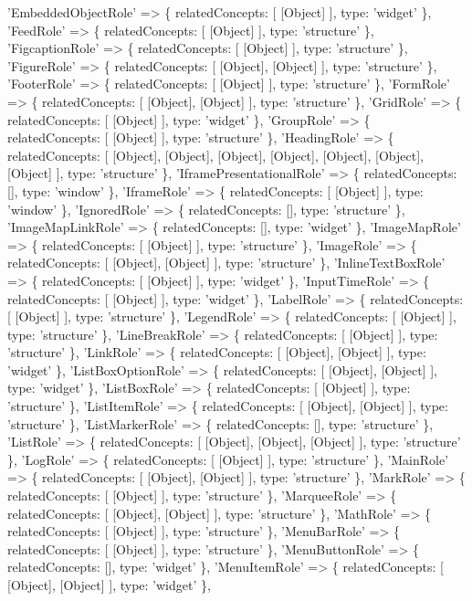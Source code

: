 \begin{DoxyCode}
  'EmbeddedObjectRole' => \{ relatedConcepts: [ [Object] ], type: 'widget' \},
  'FeedRole' => \{ relatedConcepts: [ [Object] ], type: 'structure' \},
  'FigcaptionRole' => \{ relatedConcepts: [ [Object] ], type: 'structure' \},
  'FigureRole' => \{ relatedConcepts: [ [Object], [Object] ], type: 'structure' \},
  'FooterRole' => \{ relatedConcepts: [ [Object] ], type: 'structure' \},
  'FormRole' => \{ relatedConcepts: [ [Object], [Object] ], type: 'structure' \},
  'GridRole' => \{ relatedConcepts: [ [Object] ], type: 'widget' \},
  'GroupRole' => \{ relatedConcepts: [ [Object] ], type: 'structure' \},
  'HeadingRole' => \{ relatedConcepts: [ [Object], [Object], [Object], [Object], [Object], [Object],
       [Object] ], type: 'structure' \},
  'IframePresentationalRole' => \{ relatedConcepts: [], type: 'window' \},
  'IframeRole' => \{ relatedConcepts: [ [Object] ], type: 'window' \},
  'IgnoredRole' => \{ relatedConcepts: [], type: 'structure' \},
  'ImageMapLinkRole' => \{ relatedConcepts: [], type: 'widget' \},
  'ImageMapRole' => \{ relatedConcepts: [ [Object] ], type: 'structure' \},
  'ImageRole' => \{ relatedConcepts: [ [Object], [Object] ], type: 'structure' \},
  'InlineTextBoxRole' => \{ relatedConcepts: [ [Object] ], type: 'widget' \},
  'InputTimeRole' => \{ relatedConcepts: [ [Object] ], type: 'widget' \},
  'LabelRole' => \{ relatedConcepts: [ [Object] ], type: 'structure' \},
  'LegendRole' => \{ relatedConcepts: [ [Object] ], type: 'structure' \},
  'LineBreakRole' => \{ relatedConcepts: [ [Object] ], type: 'structure' \},
  'LinkRole' => \{ relatedConcepts: [ [Object], [Object] ], type: 'widget' \},
  'ListBoxOptionRole' => \{ relatedConcepts: [ [Object], [Object] ], type: 'widget' \},
  'ListBoxRole' => \{ relatedConcepts: [ [Object] ], type: 'structure' \},
  'ListItemRole' => \{ relatedConcepts: [ [Object], [Object] ], type: 'structure' \},
  'ListMarkerRole' => \{ relatedConcepts: [], type: 'structure' \},
  'ListRole' => \{ relatedConcepts: [ [Object], [Object], [Object] ], type: 'structure' \},
  'LogRole' => \{ relatedConcepts: [ [Object] ], type: 'structure' \},
  'MainRole' => \{ relatedConcepts: [ [Object], [Object] ], type: 'structure' \},
  'MarkRole' => \{ relatedConcepts: [ [Object] ], type: 'structure' \},
  'MarqueeRole' => \{ relatedConcepts: [ [Object], [Object] ], type: 'structure' \},
  'MathRole' => \{ relatedConcepts: [ [Object] ], type: 'structure' \},
  'MenuBarRole' => \{ relatedConcepts: [ [Object] ], type: 'structure' \},
  'MenuButtonRole' => \{ relatedConcepts: [], type: 'widget' \},
  'MenuItemRole' => \{ relatedConcepts: [ [Object], [Object] ], type: 'widget' \},

\end{DoxyCode}
